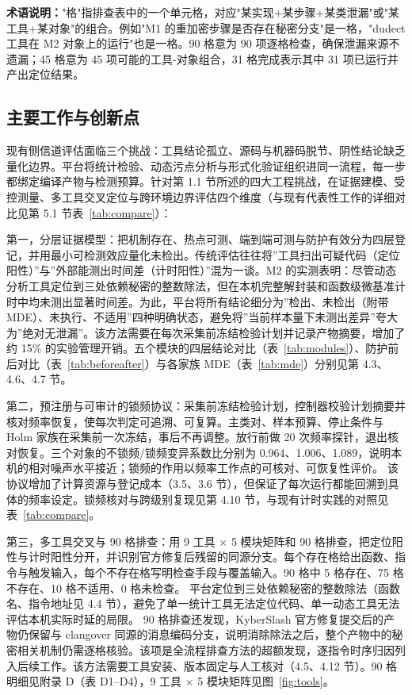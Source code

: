 \par\smallskip
{\footnotesize
\textbf{术语说明：}"格"指排查表中的一个单元格，对应"某实现+某步骤+某类泄漏"或"某工具+某对象"的组合。例如"M1 的重加密步骤是否存在秘密分支"是一格，"dudect 工具在 M2 对象上的运行"也是一格。90 格意为 90 项逐格检查，确保泄漏来源不遗漏；45 格意为 45 项可能的工具-对象组合，31 格完成表示其中 31 项已运行并产出定位结果。
}

\subsection{主要工作与创新点}

现有侧信道评估面临三个挑战：工具结论孤立、源码与机器码脱节、阴性结论缺乏量化边界。平台将统计检验、动态污点分析与形式化验证组织进同一流程，每一步都绑定编译产物与检测预算。针对第 1.1 节所述的四大工程挑战，在证据建模、受控测量、多工具交叉定位与跨环境边界评估四个维度（与现有代表性工作的详细对比见第 5.1 节表~\ref{tab:compare}）：

第一，分层证据模型：把机制存在、热点可测、端到端可测与防护有效分为四层登记，并用最小可检测效应量化未检出。传统评估往往将”工具扫出可疑代码（定位阳性）”与”外部能测出时间差（计时阳性）”混为一谈。M2 的实测表明：尽管动态分析工具定位到三处依赖秘密的整数除法，但在本机完整解封装和函数级微基准计时中均未测出显著时间差。为此，平台将所有结论细分为”检出、未检出（附带 MDE）、未执行、不适用”四种明确状态，避免将”当前样本量下未测出差异”夸大为”绝对无泄漏”。该方法需要在每次采集前冻结检验计划并记录产物摘要，增加了约 15\% 的实验管理开销。五个模块的四层结论对比（表~\ref{tab:modules}）、防护前后对比（表~\ref{tab:beforeafter}）与各家族 MDE（表~\ref{tab:mde}）分别见第 4.3、4.6、4.7 节。

第二，预注册与可审计的锁频协议：采集前冻结检验计划，控制器校验计划摘要并核对频率恢复，使每次判定可追溯、可复算。主类对、样本预算、停止条件与 Holm 家族在采集前一次冻结，事后不再调整。放行前做 20 次频率探针，退出核对恢复。三个对象的不锁频/锁频变异系数比分别为 0.964、1.006、1.089，说明本机的相对噪声水平接近；锁频的作用以频率工作点的可核对、可恢复性评价。%
该协议增加了计算资源与登记成本（3.5、3.6 节），但保证了每次运行都能回溯到具体的频率设定。锁频核对与跨级别复现见第 4.10 节，与现有计时实践的对照见表~\ref{tab:compare}。

第三，多工具交叉与 90 格排查：用 9 工具 $\times$ 5 模块矩阵和 90 格排查，把定位阳性与计时阳性分开，并识别官方修复后残留的同源分支。每个存在格给出函数、指令与触发输入，每个不存在格写明检查手段与覆盖输入。90 格中 5 格存在、75 格不存在、10 格不适用、0 格未检查。%
平台定位到三处依赖秘密的整数除法（函数名、指令地址见 4.4 节），避免了单一统计工具无法定位代码、单一动态工具无法评估本机实际时延的局限。
90 格排查还发现，KyberSlash 官方修复提交后的产物仍保留与 clangover 同源的消息编码分支，说明消除除法之后，整个产物中的秘密相关机制仍需逐格核验。该项是全流程排查方法的超额发现，逐指令时序归因列入后续工作。该方法需要工具安装、版本固定与人工核对（4.5、4.12 节）。90 格明细见附录 D（表 D1--D4），9 工具 × 5 模块矩阵见图~\ref{fig:tools}。

